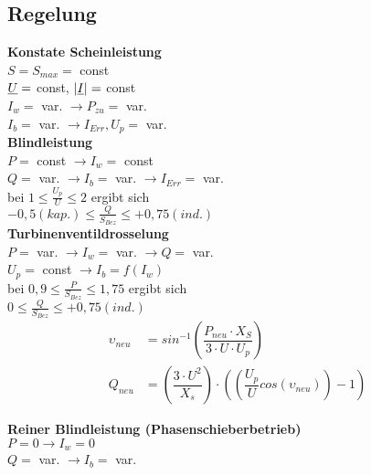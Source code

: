 \subsection{Regelung}

\textbf{Konstate Scheinleistung}\\
\indent $S = S_{max} =$ const\\
\indent $\underline{U}=$ const, $|\underline{I}| =$ const\\
\indent $I_w =$ var. $\rightarrow P_{zu}=$ var.\\
\indent $I_b =$ var. $\rightarrow I_{Err}, U_p =$ var.\\

\textbf{Blindleistung}\\
\indent $P =$ const $\rightarrow I_w= $ const\\
\indent $Q =$ var. $\rightarrow I_b = $ var. $\rightarrow I_{Err}=$ var.\\
\indent bei $1 \leq \frac{U_p}{U} \leq 2$ ergibt sich \\
\indent $-0,5 (kap.) \leq \frac{Q}{S_{Bez}} \leq +0,75(ind.)$\\

\textbf{Turbinenventildrosselung}\\
\indent $P =$ var. $\rightarrow I_w= $ var. $\rightarrow Q =$ var.\\
\indent $U_p =$ const $\rightarrow I_b = f(I_w)$\\
\indent bei $0,9 \leq \frac{P}{S_{Bez}} \leq 1,75$ ergibt sich\\
\indent $0 \leq \frac{Q}{S_{Bez}} \leq +0,75(ind.)$\\

\begin{align*}
    \upsilon_{neu} &= sin^{-1}\left( \dfrac{P_{neu} \cdot X_S}{3 \cdot U \cdot U_p}\right)\\
    Q_{neu} &= \left( \dfrac{3 \cdot U^2}{X_s}\right) \cdot \left( \left( \dfrac{U_p}{U} cos( \upsilon_{neu})\right)-1\right)
\end{align*}

\textbf{Reiner Blindleistung (Phasenschieberbetrieb)}\\
\indent $P = 0 \rightarrow I_w= 0$ \\
\indent $Q =$ var. $\rightarrow I_b = $ var.
